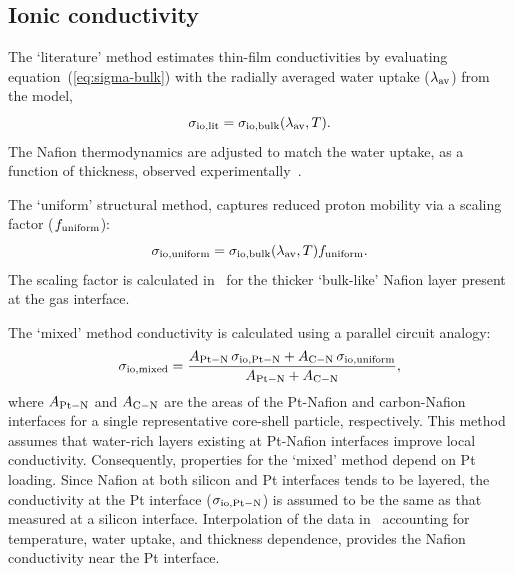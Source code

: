 \documentclass[final,3p,times,twocolumn]{elsarticle}    %
\newcommand{\crr}[1]{\color{red} #1 \color{black}}
\begin{document}
\subsection{Ionic conductivity}
\label{sect:ionic-conductivity}
\crr{The `literature' method estimates thin-film conductivities by evaluating equation~(\ref{eq:sigma-bulk}) with the radially averaged water uptake ($\lambda_{\rm av}$) from the model,
\begin{equation}
    \sigma_{\rm io, lit} = \sigma_{\rm io, bulk}(\lambda_{\rm av},T).
\end{equation}
The Nafion thermodynamics are adjusted to match the  water uptake, as a function of thickness, observed experimentally~\cite{bib:decaluwe_2018}.

The `uniform' structural method, captures reduced proton mobility via a scaling factor ($f_{\rm uniform}$):
\begin{equation} \label{eq:sigma-uniform}
    \sigma_{\rm io, uniform} = \sigma_{\rm io, bulk}(\lambda_{\rm av},T) f_{\rm uniform}.
\end{equation}
The scaling factor is calculated in~\cite{bib:decaluwe_2018} for the thicker `bulk-like' Nafion layer present at the gas interface.

The `mixed' method conductivity is calculated using a parallel circuit analogy: 
\begin{equation}
    \sigma_{\rm io, mixed} = 
    \frac{A_{\rm Pt-N}\,\sigma_{\rm io, Pt-N} + A_{\rm C-N}\,\sigma_{\rm io, uniform}}{A_{\rm Pt-N}+A_{\rm C-N}},
\end{equation}
where $A_{\rm Pt-N}$ and $A_{\rm C-N}$ are the areas of the Pt-Nafion and carbon-Nafion interfaces for a single representative core-shell particle, respectively. This method assumes that water-rich layers existing at Pt-Nafion interfaces improve local conductivity. Consequently, properties for the `mixed' method depend on Pt loading. Since Nafion at both silicon and Pt interfaces tends to be layered, the conductivity at the Pt interface ($\sigma_{\rm io, Pt-N}$) is assumed to be the same as that measured at a silicon interface. Interpolation of the data in~\cite{bib:paul_mccreery_2014} accounting for temperature, water uptake, and thickness dependence, provides the Nafion conductivity near the Pt interface.}
\end{document}
